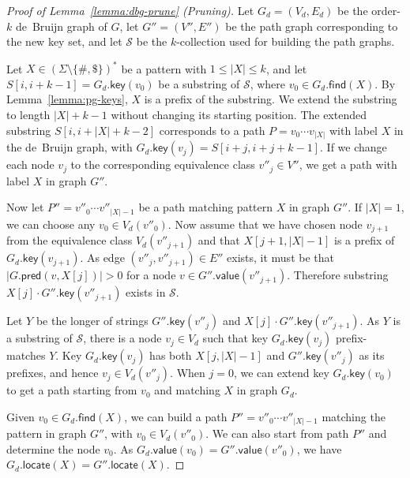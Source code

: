 \documentclass[a4paper,UKenglish]{lipics-v2016}
\newcommand{\set}[1]{\ensuremath{\{ #1 \}}}
\newcommand{\abs}[1]{\ensuremath{\lvert #1 \rvert}}
\newcommand{\find}{\ensuremath{\mathsf{find}}}
\newcommand{\locate}{\ensuremath{\mathsf{locate}}}
\newcommand{\gpred}{\ensuremath{\mathsf{pred}}}
\newcommand{\gkey}{\ensuremath{\mathsf{key}}}
\newcommand{\gvalue}{\ensuremath{\mathsf{value}}}
\newcommand{\kcollection}[1]{$#1$\nobreakdash-collection}
\newcommand{\orderk}[1]{order\nobreakdash-$#1$}
\newcommand{\patternset}{\ensuremath{(\Sigma \setminus \set{\#, \$})^{\ast}}}
\begin{document}
\begin{proof}[Proof of Lemma~\ref{lemma:dbg-prune} (Pruning)]
Let $G_{d} = (V_{d}, E_{d})$ be the \orderk{k} de~Bruijn graph of $G$, let $G'' = (V'', E'')$ be the path graph corresponding to the new key set, and let $\mathcal{S}$ be the \kcollection{k} used for building the path graphs.

Let $X \in \patternset$ be a pattern with $1 \le \abs{X} \le k$, and let $S[i, i+k-1] = G_{d}.\gkey(v_{0})$ be a substring of $\mathcal{S}$, where $v_{0} \in G_{d}.\find(X)$. By Lemma~\ref{lemma:pg-keys}, $X$ is a prefix of the substring. We extend the substring to length $\abs{X}+k-1$ without changing its starting position. The extended substring $S[i, i+\abs{X}+k-2]$ corresponds to a path $P = v_{0} \dotsm v_{\abs{X}}$ with label $X$ in the de~Bruijn graph, with $G_{d}.\gkey(v_{j}) = S[i+j, i+j+k-1]$. If we change each node $v_{j}$ to the corresponding equivalence class $v''_{j} \in V''$, we get a path with label $X$ in graph $G''$.

Now let $P'' = v''_{0} \dotsm v''_{\abs{X}-1}$ be a path matching pattern $X$ in graph $G''$. If $\abs{X} = 1$, we can choose any $v_{0} \in V_{d}(v''_{0})$. Now assume that we have chosen node $v_{j+1}$ from the equivalence class $V_{d}(v''_{j+1})$ and that $X[j+1, \abs{X}-1]$ is a prefix of $G_{d}.\gkey(v_{j+1})$. As edge $(v''_{j}, v''_{j+1}) \in E''$ exists, it must be that $\abs{G.\gpred(v, X[j])} > 0$ for a node $v \in G''.\gvalue(v''_{j+1})$. Therefore substring $X[j] \cdot G''.\gkey(v''_{j+1})$ exists in $\mathcal{S}$.

Let $Y$ be the longer of strings $G''.\gkey(v''_{j})$ and $X[j] \cdot G''.\gkey(v''_{j+1})$. As $Y$ is a substring of $\mathcal{S}$, there is a node $v_{j} \in V_{d}$ such that key $G_{d}.\gkey(v_{j})$ prefix-matches $Y$. Key $G_{d}.\gkey(v_{j})$ has both $X[j, \abs{X}-1]$ and $G''.\gkey(v''_{j})$ as its prefixes, and hence $v_{j} \in V_{d}(v''_{j})$. When $j = 0$, we can extend key $G_{d}.\gkey(v_{0})$ to get a path starting from $v_{0}$ and matching $X$ in graph $G_{d}$.

Given $v_{0} \in G_{d}.\find(X)$, we can build a path $P'' = v''_{0} \dotsm v''_{\abs{X}-1}$ matching the pattern in graph $G''$, with $v_{0} \in V_{d}(v''_{0})$. We can also start from path $P''$ and determine the node $v_{0}$. As $G_{d}.\gvalue(v_{0}) = G''.\gvalue(v''_{0})$, we have $G_{d}.\locate(X) = G''.\locate(X)$.
\end{proof}
\end{document}
